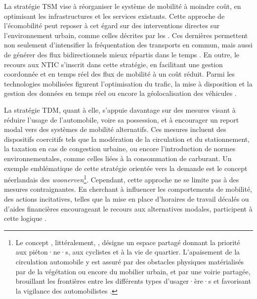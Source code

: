 \begin{refsegment}
La stratégie \acrshort{TSM} vise à réorganiser le système de mobilité à moindre coût, en optimisant les infrastructures et les services existants. Cette approche de l’écomobilité peut reposer à cet égard sur des interventions directes sur l’environnement urbain, comme celles décrites par les . Ces dernières permettent non seulement d’intensifier la fréquentation des transports en commun, mais aussi de générer des flux bidirectionnels mieux répartis dans le temps \textcolor{blue}{\autocite[4]{grigolon_transit-oriented_2016}}. En outre, le recours aux \acrfull{NTIC} s’inscrit dans cette stratégie, en facilitant une gestion coordonnée et en temps réel des flux de mobilité à un coût réduit. Parmi les technologies mobilisées figurent l’optimisation du trafic, la mise à disposition et la gestion des données en temps réel ou encore la géolocalisation des véhicules \textcolor{blue}{\autocite[96]{cervero_transit_1998}}.%

La stratégie \acrshort{TDM}, quant à elle, s’appuie davantage sur des mesures visant à réduire l’usage de l’automobile, voire sa possession, et à encourager un report modal vers des systèmes de mobilité alternatifs. Ces mesures incluent des dispositifs coercitifs tels que la modération de la circulation et du stationnement, la taxation en cas de congestion urbaine, ou encore l’introduction de normes environnementales, comme celles liées à la consommation de carburant. Un exemple emblématique de cette stratégie orientée vers la demande est le concept néerlandais des \textsl{woonerven}\footnote{
    Le concept , littéralement, , désigne un espace partagé donnant la priorité aux piéton·ne·s, aux cyclistes et à la vie de quartier. L’apaisement de la circulation automobile y est assuré par des obstacles physiques matérialisés par de la végétation ou encore du mobilier urbain, et par une voirie partagée, brouillant les frontières entre les différents types d’usager·ère·s et favorisant la vigilance des automobilistes \textcolor{blue}{\autocite[3]{collarte_woonerf_2012}}.
}. Cependant, cette approche ne se limite pas à des mesures contraignantes. En cherchant à influencer les comportements de mobilité, des actions incitatives, telles que la mise en place d’horaires de travail décalés ou d'aides financières encourageant le recours aux alternatives modales, participent à cette logique \textcolor{blue}{\autocite[97]{cervero_transit_1998}}.%


\end{refsegment}
